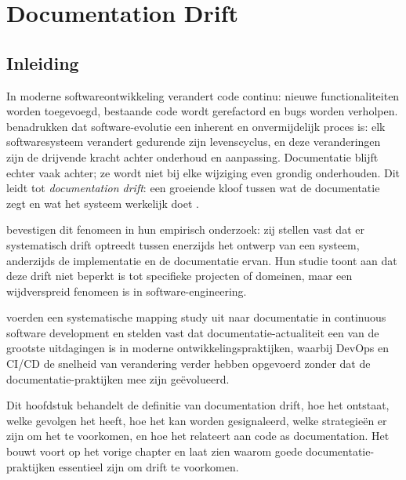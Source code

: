 \chapter{Documentation Drift}
\label{chap:documentation-drift}

\section{Inleiding}
\label{sec:drift-intro}

In moderne softwareontwikkeling verandert code continu: nieuwe functionaliteiten worden toegevoegd, bestaande code wordt gerefactord en bugs worden verholpen. \textcite{tripathy2014softwareevolution} benadrukken dat software-evolutie een inherent en onvermijdelijk proces is: elk softwaresysteem verandert gedurende zijn levenscyclus, en deze veranderingen zijn de drijvende kracht achter onderhoud en aanpassing. Documentatie blijft echter vaak achter; ze wordt niet bij elke wijziging even grondig onderhouden. Dit leidt tot \textit{documentation drift}: een groeiende kloof tussen wat de documentatie zegt en wat het systeem werkelijk doet \autocite{whiting2020drifterosion}.

\textcite{romeo2024didrift} bevestigen dit fenomeen in hun empirisch onderzoek: zij stellen vast dat er systematisch drift optreedt tussen enerzijds het ontwerp van een systeem, anderzijds de implementatie en de documentatie ervan. Hun studie toont aan dat deze drift niet beperkt is tot specifieke projecten of domeinen, maar een wijdverspreid fenomeen is in software-engineering.

\textcite{theunissen2022mappingdocumentation} voerden een systematische mapping study uit naar documentatie in continuous software development en stelden vast dat documentatie-actualiteit een van de grootste uitdagingen is in moderne ontwikkelingspraktijken, waarbij DevOps en CI/CD de snelheid van verandering verder hebben opgevoerd zonder dat de documentatie-praktijken mee zijn geëvolueerd.

Dit hoofdstuk behandelt de definitie van documentation drift, hoe het ontstaat, welke gevolgen het heeft, hoe het kan worden gesignaleerd, welke strategieën er zijn om het te voorkomen, en hoe het relateert aan code as documentation. Het bouwt voort op het vorige chapter en laat zien waarom goede documentatie-praktijken essentieel zijn om drift te voorkomen.

